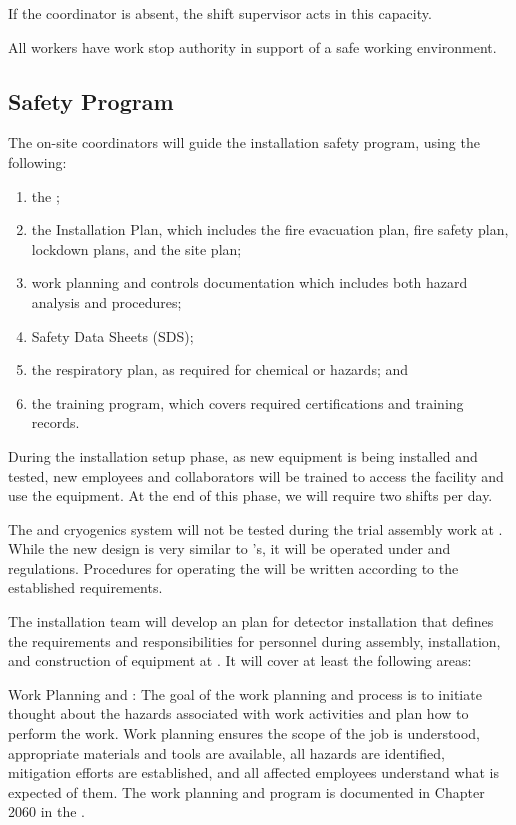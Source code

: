 If the  coordinator is absent, the shift supervisor acts in this capacity.

All workers have work stop authority in support of a safe working environment. 

\subsection{Safety Program}

The on-site  coordinators will guide the  installation safety program, using the following:

\begin{enumerate}
\item	the ;
\item the  Installation  Plan, which includes the fire evacuation plan, fire safety plan, lockdown plans, and the site plan;
\item	work planning and controls documentation which includes both hazard analysis and procedures; 
\item	Safety Data Sheets (SDS); 
\item	the respiratory plan, as required for chemical or  hazards; and 
\item	the training program, which covers required certifications and  training records.
\end{enumerate}


During the installation setup phase, as new equipment is being installed and tested, new employees and collaborators will be trained to access the facility and use the equipment. At the end of this phase, we will require two shifts per day.


The \coldbox and cryogenics system will not be 
tested during the trial assembly work at . 
While the new \coldbox design is very similar to 's, it will be operated under  and  regulations.  Procedures for operating the \coldbox will be written according to the established requirements.

The  installation team
 will develop an   plan for detector  installation that defines  
the  requirements and responsibilities for personnel during  assembly, installation, and construction of equipment at . It will cover at least the following areas:

{Work Planning and :} The goal of the work planning and  process is to initiate thought about the hazards associated with work activities and plan how to perform the work. Work planning ensures the scope of the job is understood, appropriate materials and tools are available, all hazards are identified, mitigation efforts are established, and all affected employees understand what is expected of them. 
The work planning and  program is documented in Chapter 2060 in the .

